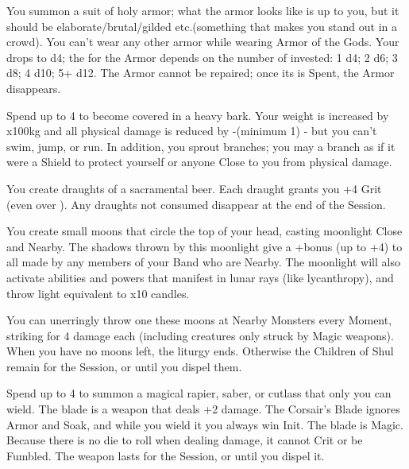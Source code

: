 \begin{multicols*}{2}
\LITURGY [
  Name = Armor of the Gods,
  Link = arcana-mystery-armor-of-the-gods,
  Paradigm = Civilized
]

You summon a suit of holy armor; what the armor looks like is up to you, but it should be elaborate/brutal/gilded etc.\@ (something that makes you stand out in a crowd). You can't wear any other armor while wearing Armor of the Gods.  Your \MD drops to d4; the \UD for the Armor depends on the number of \DICE invested: 1 d4; 2 d6; 3 d8; 4 d10; 5+ d12.  The Armor cannot be repaired; once its \UD is Spent, the Armor disappears.

\LITURGY [
  Name = Barkskin,
  Link = arcana-mystery-barkskin,
  Paradigm = Heathen
]

Spend up to 4 \DICE to become covered in a heavy bark.  Your weight is increased by \DICE x100kg and all physical damage is reduced by -\DICE (minimum 1) - but you can't swim, jump, or run. In addition, you sprout \DICE branches; you may  a branch as if it were a Shield to protect yourself or anyone Close to you from physical damage.


\LITURGY [
  Name = Blessed Brew,
  Link = arcana-mystery-blessed-brew,
  Paradigm = Civilized
]

You create \DICE draughts of a sacramental beer. Each draught grants you +4 Grit (even over \MAX). Any draughts not consumed disappear at the end of the Session.

\LITURGY [
  Name = Children of Shul,
  Link = arcana-mystery-children-of-shul,
  Paradigm = Empyrean
]

You create \DICE small moons that circle the top of your head, casting moonlight Close and Nearby. The shadows thrown by this moonlight give a +\DICE bonus (up to +4) to all  made by any members of your Band who are Nearby. The moonlight will also activate abilities and powers that manifest in lunar rays (like lycanthropy), and throw light equivalent to \DICE x10 candles.

You can unerringly throw one these moons at Nearby Monsters every Moment, striking for 4 damage each (including creatures only struck by Magic weapons).  When you have no moons left, the liturgy ends. Otherwise the Children of Shul remain for the Session, or until you dispel them.

\LITURGY [
  Name = Corsair's Blade,
  Link = arcana-mystery-corsairs-blade,
  Paradigm = Errant
]

Spend up to 4 \DICE to summon a magical rapier, saber, or cutlass that only you can wield.  The blade is a \FOC weapon that deals \DICE+2 damage. The Corsair's Blade ignores Armor and Soak, and while you wield it you always win Init. The blade is Magic. Because there is no die to roll when dealing damage, it cannot Crit or be Fumbled. The weapon lasts for the Session, or until you dispel it.



\end{multicols*}
